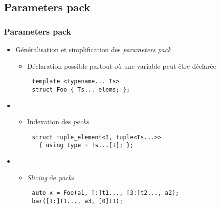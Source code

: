\documentclass[C++.tex]{subfiles}
\begin{document}
\subsection*{Parameters pack}
\begin{frame}[fragile]
	\frametitle{Parameters pack}
	\begin{itemize}
		\item Généralisation et simplification des \textit{parameters pack}
		\begin{itemize}
			\item Déclaration possible partout où une variable peut être déclarée
		\end{itemize}
	\end{itemize}

	\begin{verbatim}
		template <typename... Ts>
		struct Foo { Ts... elems; };
	\end{verbatim}

	\begin{itemize}
		\item [] 
		\begin{itemize}
			\item Indexation des \textit{packs}
		\end{itemize}
	\end{itemize}

	\begin{verbatim}
		struct tuple_element<I, tuple<Ts...>>
		  { using type = Ts...[I]; };
	\end{verbatim}

	\begin{itemize}
		\item [] 
		\begin{itemize}
			\item \textit{Slicing} de \textit{packs}
		\end{itemize}
	\end{itemize}

	\begin{verbatim}
		auto x = Foo(a1, [:]t1..., [3:]t2..., a2);
		bar([1:]t1..., a3, [0]t1);
	\end{verbatim}
\end{frame}
\end{document}
